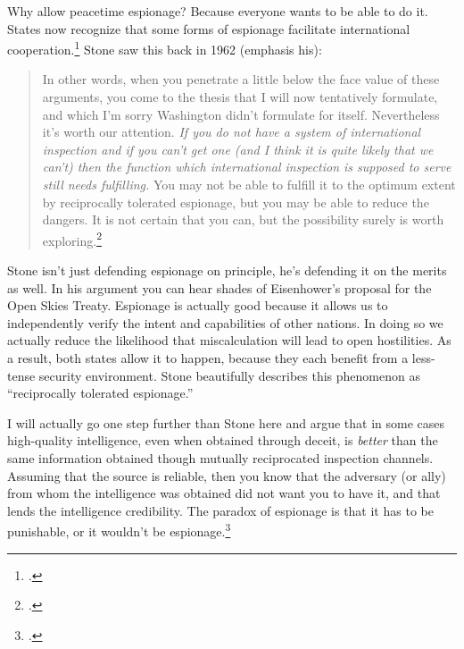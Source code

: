 \documentclass[12pt]{article}
\begin{document}
Why allow peacetime espionage? Because everyone wants to be able to do it. States now recognize that some forms of espionage facilitate international cooperation.\footcite{baker_tolerance_2004} Stone saw this back in 1962 (emphasis his):



\begin{quote}
In other words, when you penetrate a little below the face value of these arguments, you come to the thesis that I will now tentatively formulate, and which I'm sorry Washington didn't formulate for itself. Nevertheless it's worth our attention. \emph{If you do not have a system of international inspection and if you can't get one (and I think it is quite likely that we can't) then the function which international inspection is supposed to serve still needs fulfilling.} You may not be able to fulfill it to the optimum extent by reciprocally tolerated espionage, but you may be able to reduce the dangers. It is not certain that you can, but the possibility surely is worth exploring.\footcite[p.~41]{stone_legal_1962}
\end{quote}

Stone isn't just defending espionage on principle, he's defending it on the merits as well. In his argument you can hear shades of Eisenhower's proposal for the Open Skies Treaty. Espionage is actually good because it allows us to independently verify the intent and capabilities of other nations. In doing so we actually reduce the likelihood that miscalculation will lead to open hostilities. As a result, both states allow it to happen, because they each benefit from a less-tense security environment. Stone beautifully describes this phenomenon as ``reciprocally tolerated espionage.''

I will actually go one step further than Stone here and argue that in some cases high-quality intelligence, even when obtained through deceit, is \emph{better} than the same information obtained though mutually reciprocated inspection channels. Assuming that the source is reliable, then you know that the adversary (or ally) from whom the intelligence was obtained did not want you to have it, and that lends the intelligence credibility. The paradox of espionage is that it has to be punishable, or it wouldn't be espionage.\footcite[p.~347]{demarest_espionage_1995}
\end{document}
